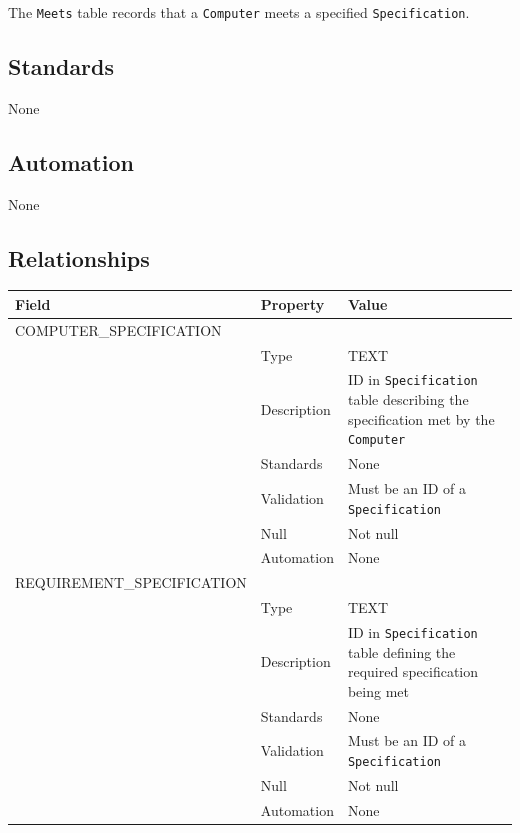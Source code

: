\documentclass[
]{article}
\newcounter{none} %
\begin{document}
The \texttt{Meets} table records that a \texttt{Computer} meets a
specified \texttt{Specification}.

\subsection{Standards}\label{standards-19}

None

\subsection{Automation}\label{automation-19}

None

\subsection{Relationships}\label{relationships-15}

{\def\LTcaptype{none} %
\begin{longtable}[]{@{}
  >{\raggedright\arraybackslash}p{}
  >{\raggedright\arraybackslash}p{}
  >{\raggedright\arraybackslash}p{}@{}}
\toprule\noalign{}
\begin{minipage}[b]{\linewidth}\raggedright
Field
\end{minipage} & \begin{minipage}[b]{\linewidth}\raggedright
Property
\end{minipage} & \begin{minipage}[b]{\linewidth}\raggedright
Value
\end{minipage} \\
\midrule\noalign{}
\endhead
\bottomrule\noalign{}
\endlastfoot
COMPUTER\_SPECIFICATION & & \\
& Type & TEXT \\
& Description & ID in \texttt{Specification} table describing the
specification met by the \texttt{Computer} \\
& Standards & None \\
& Validation & Must be an ID of a \texttt{Specification} \\
& Null & Not null \\
& Automation & None \\
REQUIREMENT\_SPECIFICATION & & \\
& Type & TEXT \\
& Description & ID in \texttt{Specification} table defining the required
specification being met \\
& Standards & None \\
& Validation & Must be an ID of a \texttt{Specification} \\
& Null & Not null \\
& Automation & None \\
\end{longtable}
}
\end{document}
